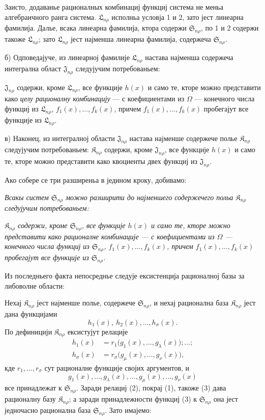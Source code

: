 ﻿\documentclass[11pt]{article}
\providecommand{\Kfield}{\mathfrak{K}}
\providecommand{\Ssys}{\mathfrak{S}}
\providecommand{\Jdom}{\mathfrak{J}}
\providecommand{\Lsys}{\mathfrak{L}}
\begin{document}
Заисто, додаванье рационалных комбинациј функциј система не меньа алгебраичного ранга система. $\Lsys_{n\rho}$ исполньа условја 1 и 2, зато јест линеарна фамилија. Далье, всака линеарна фамилија, ктора содержи $\Ssys_{n\rho}$, по 1 и 2 содержи такоже $\Lsys_{n\rho}$; зато $\Lsys_{n\rho}$ јест најменша линеарна фамилија, содержеча $\Ssys_{n\rho}$.

б) Одповедајуче, из линеарној фамилије $\Lsys_{n\rho}$ настава најменша содержеча интегрална област $\Jdom_{n\rho}$ следујучим потребованьем:

$\Jdom_{n\rho}$ содержи, кроме $\Lsys_{n\rho}$, все функције $h(x)$ и само те, кторе можно представити како {\itshape целу рационалну комбинацију} --- с коефициентами из $\Omega$ --- конечного числа функциј из $\Lsys_{n\rho}$, $f_1(x),\ldots,f_k(x)$, причем $f_1(x),\ldots,f_k(x)$ пробегајут все функције из $\Lsys_{n\rho}$.

в) Наконец, из интегралној области $\Jdom_{n\rho}$ настава најменше содержече полье $\Kfield_{n\rho}$ следујучим потребованьем: $\Kfield_{n\rho}$ содержи, кроме $\Jdom_{n\rho}$, все функције $h(x)$ и само те, кторе можно представити како квоциенты двех функциј из $\Jdom_{n\rho}$.

Ако собере се три разширеньа в једином кроку, добивамо:

{\itshape Всакы систем $\Ssys_{n\rho}$ можно разширити до најменшего содержечего польа $\Kfield_{n\rho}$ следујучим потребованьем:}

{\itshape $\Kfield_{n\rho}$ содержи, кроме $\Ssys_{n\rho}$, все функције $h(x)$ и само те, кторе можно представити како рационалне комбинације --- с коефициентами из $\Omega$ --- конечного числа функциј из $\Ssys_{n\rho}$, $f_1(x),\ldots,f_k(x)$, причем $f_1(x),\ldots,f_k(x)$ пробегајут все функције из $\Ssys_{n\rho}$.}

Из последньего факта непосреднье следује ексистенција рационалној базы за либоволне области:

Нехај $\Kfield_{n\rho}$ јест најменше полье, содержече $\Ssys_{n\rho}$, и нехај рационална база $\Kfield_{n\rho}$ јест дана функцијами
\begin{equation}
  h_1(x),\ h_2(x),\ldots,h_\sigma(x).
\tag{1}
\end{equation}
По дефиницији $\Kfield_{n\rho}$ ексистујут релације
\begin{equation}
\begin{aligned}
 h_1(x)&=r_1\bigl(g_1(x),\ldots,g_\lambda(x)\bigr);\ldots;\\
 h_\sigma(x)&=r_\sigma\bigl(g_\mu(x),\ldots,g_\nu(x)\bigr),
\end{aligned}
\tag{2}
\end{equation}
кде $r_1,\ldots,r_\sigma$ сут рационалне функције својих аргументов, и
\begin{equation}
  g_1(x),\ldots,g_\lambda(x),\ldots,
  g_\mu(x),\ldots,g_\nu(x)
\tag{3}
\end{equation}
все принадлежат к $\Ssys_{n\rho}$. Заради релациј (2), покрај (1), такоже (3) дава рационалну базу $\Kfield_{n\rho}$; а заради принадлежности функциј (3) к $\Ssys_{n\rho}$ она јест једночасно рационална база $\Ssys_{n\rho}$. Зато имајемо:
\end{document}
